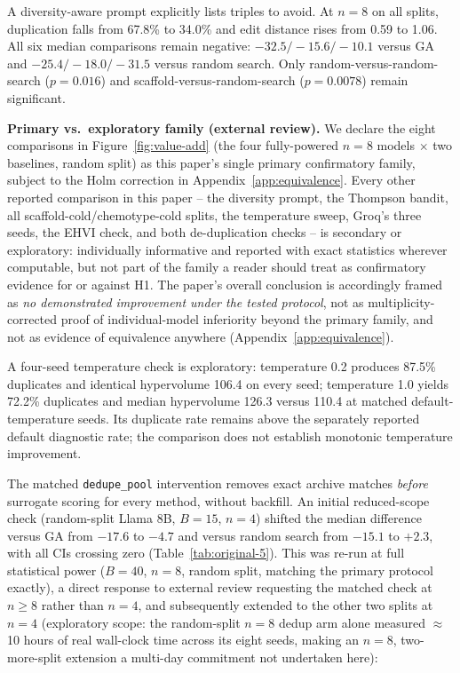 \documentclass{article}
\begin{document}
A diversity-aware prompt explicitly lists triples to avoid. At $n=8$ on all splits, duplication falls from 67.8\% to 34.0\% and edit distance rises from 0.59 to 1.06. All six median comparisons remain negative: $-32.5/-15.6/-10.1$ versus GA and $-25.4/-18.0/-31.5$ versus random search. Only random-versus-random-search ($p=0.016$) and scaffold-versus-random-search ($p=0.0078$) remain significant.

\textbf{Primary vs.\ exploratory family (external review).} We declare the eight comparisons in Figure~\ref{fig:value-add} (the four fully-powered $n=8$ models $\times$ two baselines, random split) as this paper's single primary confirmatory family, subject to the Holm correction in Appendix~\ref{app:equivalence}. Every other reported comparison in this paper -- the diversity prompt, the Thompson bandit, all scaffold-cold/chemotype-cold splits, the temperature sweep, Groq's three seeds, the EHVI check, and both de-duplication checks -- is secondary or exploratory: individually informative and reported with exact statistics wherever computable, but not part of the family a reader should treat as confirmatory evidence for or against H1. The paper's overall conclusion is accordingly framed as \emph{no demonstrated improvement under the tested protocol}, not as multiplicity-corrected proof of individual-model inferiority beyond the primary family, and not as evidence of equivalence anywhere (Appendix~\ref{app:equivalence}).

A four-seed temperature check is exploratory: temperature 0.2 produces 87.5\% duplicates and identical hypervolume 106.4 on every seed; temperature 1.0 yields 72.2\% duplicates and median hypervolume 126.3 versus 110.4 at matched default-temperature seeds. Its duplicate rate remains above the separately reported default diagnostic rate; the comparison does not establish monotonic temperature improvement.

The matched \texttt{dedupe\_pool} intervention removes exact archive matches \emph{before} surrogate scoring for every method, without backfill. An initial reduced-scope check (random-split Llama 8B, $B=15$, $n=4$) shifted the median difference versus GA from $-17.6$ to $-4.7$ and versus random search from $-15.1$ to $+2.3$, with all CIs crossing zero (Table~\ref{tab:original-5}). This was re-run at full statistical power ($B=40$, $n=8$, random split, matching the primary protocol exactly), a direct response to external review requesting the matched check at $n\ge8$ rather than $n=4$, and subsequently extended to the other two splits at $n=4$ (exploratory scope: the random-split $n=8$ dedup arm alone measured $\approx$10 hours of real wall-clock time across its eight seeds, making an $n=8$, two-more-split extension a multi-day commitment not undertaken here):
\end{document}

